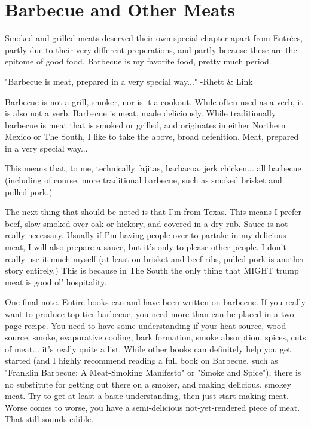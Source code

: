 \chapter{Barbecue and Other Meats}
\label{barbecueAndOtherMeats}
\setcounter{secnumdepth}{0}
\minitoc
Smoked and grilled meats deserved their own special chapter apart from Entrées, partly due to their very different preperations, and partly because these are the epitome of good food. Barbecue is my favorite food, pretty much period.

"Barbecue is meat, prepared in a very special way..." -Rhett \& Link

Barbecue is not a grill, smoker, nor is it a cookout. While often used as a verb, it is also not a verb. Barbecue is meat, made deliciously. While traditionally barbecue is meat that is smoked or grilled, and originates in either Northern Mexico or The South, I like to take the above, broad defenition. Meat, prepared in a very special way...

This means that, to me, technically fajitas, barbacoa, jerk chicken... all barbecue (including of course, more traditional barbecue, such as smoked brisket and pulled pork.)

The next thing that should be noted is that I'm from Texas. This means I prefer beef, slow smoked over oak or hickory, and covered in a dry rub. Sauce is not really necessary. Usually if I'm having people over to partake in my delicious meat, I will also prepare a sauce, but it's only to please other people. I don't really use it much myself (at least on brisket and beef ribs, pulled pork is another story entirely.) This is because in The South the only thing that MIGHT trump meat is good ol' hospitality.

One final note. Entire books can and have been written on barbecue. If you really want to produce top tier barbecue, you need more than can be placed in a two page recipe. You need to have some understanding if your heat source, wood source, smoke, evaporative cooling, bark formation, smoke absorption, spices, cuts of meat... it's really quite a list. While other books can definitely help you get started (and I highly recommend reading a full book on Barbecue, such as "Franklin Barbecue: A Meat-Smoking Manifesto" or "Smoke and Spice"), there is no substitute for getting out there on a smoker, and making delicious, smokey meat. Try to get at least a basic understanding, then just start making meat. Worse comes to worse, you have a semi-delicious not-yet-rendered piece of meat. That still sounds edible.

